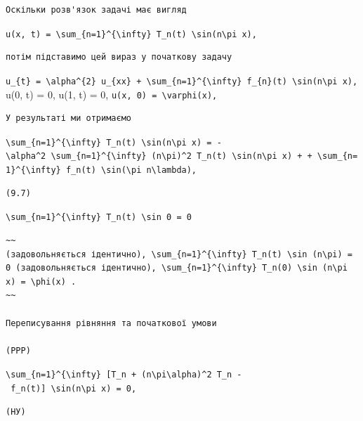\documentclass[
  ukrainian,
]{article}
\begin{document}
\begin{verbatim}
Оскільки розв'язок задачі має вигляд
\end{verbatim}

\texttt{u(x,\ t)\ =\ \textbackslash{}sum\_\{n=1\}\^{}\{\textbackslash{}infty\}\ T\_n(t)\ \textbackslash{}sin(n\textbackslash{}pi\ x),}

\begin{verbatim}
потім підставимо цей вираз у початкову задачу
\end{verbatim}

\texttt{u\_\{t\}\ =\ \textbackslash{}alpha\^{}\{2\}\ u\_\{xx\}\ +\ \textbackslash{}sum\_\{n=1\}\^{}\{\textbackslash{}infty\}\ f\_\{n\}(t)\ \textbackslash{}sin(n\textbackslash{}pi\ x),}
u(0, t) = 0, u(1, t) = 0,
\texttt{u(x,\ 0)\ =\ \textbackslash{}varphi(x),}

\begin{verbatim}
У результаті ми отримаємо
\end{verbatim}

\texttt{\textbackslash{}sum\_\{n=1\}\^{}\{\textbackslash{}infty\}\ T\textquotesingle{}\_n(t)\ \textbackslash{}sin(n\textbackslash{}pi\ x)\ =\ -\textbackslash{}alpha\^{}2\ \textbackslash{}sum\_\{n=1\}\^{}\{\textbackslash{}infty\}\ (n\textbackslash{}pi)\^{}2\ T\_n(t)\ \textbackslash{}sin(n\textbackslash{}pi\ x)\ +\ +\ \textbackslash{}sum\_\{n=1\}\^{}\{\textbackslash{}infty\}\ f\_n(t)\ \textbackslash{}sin(\textbackslash{}pi\ n\textbackslash{}lambda),}

\begin{verbatim}
(9.7)
\end{verbatim}

\texttt{\textbackslash{}sum\_\{n=1\}\^{}\{\textbackslash{}infty\}\ T\_n(t)\ \textbackslash{}sin\ 0\ =\ 0}

\begin{verbatim}
~~
(задовольняється ідентично), \sum_{n=1}^{\infty} T_n(t) \sin (n\pi) = 0 (задовольняється ідентично), \sum_{n=1}^{\infty} T_n(0) \sin (n\pi x) = \phi(x) .
~~

Переписування рівняння та початкової умови

(PPP)
\end{verbatim}

\texttt{\textbackslash{}sum\_\{n=1\}\^{}\{\textbackslash{}infty\}\ {[}T\textquotesingle{}\_n\ +\ (n\textbackslash{}pi\textbackslash{}alpha)\^{}2\ T\_n\ -\ f\_n(t){]}\ \textbackslash{}sin(n\textbackslash{}pi\ x)\ =\ 0,}

\begin{verbatim}
(НУ)
\end{verbatim}
\end{document}
